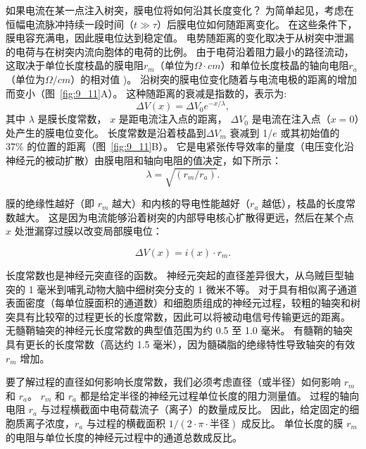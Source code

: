 如果电流在某一点注入树突，膜电位将如何沿其长度变化？
为简单起见，考虑在恒幅电流脉冲持续一段时间（$t \gg \tau$）后膜电位如何随距离变化。
在这些条件下，膜电容充满电，因此膜电位达到稳定值。
电势随距离的变化取决于从树突中泄漏的电荷与在树突内流向胞体的电荷的比例。
由于电荷沿着阻力最小的路径流动，这取决于单位长度枝晶的膜电阻$r_m$（单位为$\Omega \cdot cm$）和单位长度枝晶的轴向电阻$r_a$（单位为$\Omega/cm$）的相对值 )。
沿树突的膜电位变化随着与电流电极的距离的增加而变小（图~\ref{fig:9_11}A）。
这种随距离的衰减是指数的，表示为:
\begin{equation}
	\Delta V(x) = 
		\Delta V_0 e^{-x/\lambda},
\end{equation}
其中 $\lambda$ 是膜长度常数，
$x$ 是距电流注入点的距离，
$\Delta V_0$ 是电流在注入点（$x = 0$）处产生的膜电位变化。
长度常数是沿着枝晶到$\Delta V_m$ 衰减到 1/$e$ 或其初始值的 37\% 的位置的距离（图~\ref{fig:9_11}B）。
它是电紧张传导效率的量度（电压变化沿神经元的被动扩散）由膜电阻和轴向电阻的值决定，如下所示：
\begin{equation}
	\lambda = \sqrt{(r_m / r_a)}.
\end{equation}


膜的绝缘性越好（即 $r_m$ 越大）和内核的导电性能越好（$r_a$ 越低），枝晶的长度常数越大。
这是因为电流能够沿着树突的内部导电核心扩散得更远，然后在某个点 $x$ 处泄漏穿过膜以改变局部膜电位：

\begin{equation}
	\Delta V(x) = i(x) \cdot r_m.
\end{equation}


长度常数也是神经元突直径的函数。
神经元突起的直径差异很大，从乌贼巨型轴突的 1 毫米到哺乳动物大脑中细树突分支的 1 微米不等。
对于具有相似离子通道表面密度（每单位膜面积的通道数）和细胞质组成的神经元过程，较粗的轴突和树突具有比较窄的过程更长的长度常数，因此可以将被动电信号传输更远的距离。
无髓鞘轴突的神经元长度常数的典型值范围为约 0.5 至 1.0 毫米。
有髓鞘的轴突具有更长的长度常数（高达约 1.5 毫米），因为髓磷脂的绝缘特性导致轴突的有效 $r_m$ 增加。


要了解过程的直径如何影响长度常数，我们必须考虑直径（或半径）如何影响 $r_m$ 和 $r_a$。
$r_m$ 和 $r_a$ 都是给定半径的神经元过程单位长度的阻力测量值。
过程的轴向电阻 $r_a$ 与过程横截面中电荷载流子（离子）的数量成反比。 
因此，给定固定的细胞质离子浓度，$r_a$ 与过程的横截面积 $1 / (2 \cdot \pi \cdot \texttt{半径})$ 成反比。
单位长度的膜 $r_m$ 的电阻与单位长度的神经元过程中的通道总数成反比。


